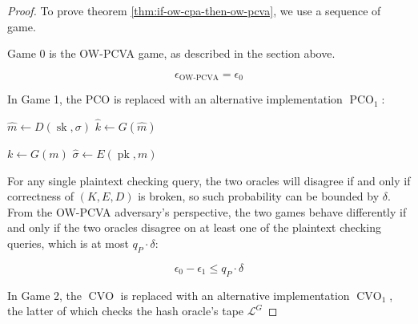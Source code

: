 \documentclass{article}
\newcommand{\pk}{\operatorname{pk}}
\newcommand{\sk}{\operatorname{sk}}
\newcommand{\pco}{\operatorname{PCO}}
\newcommand{\cvo}{\operatorname{CVO}}
\newcommand{\llbrack}{[\![}
\newcommand{\rrbrack}{]\!]}
\begin{document}
\begin{proof}
    To prove theorem \ref{thm:if-ow-cpa-then-ow-pcva}, we use a sequence of game.

    Game 0 is the OW-PCVA game, as described in the section above.

    \begin{equation*}
        \epsilon_\text{OW-PCVA} = \epsilon_0
    \end{equation*}

    In Game 1, the PCO is replaced with an alternative implementation $\pco_1$:

    \begin{multicols}{2}
        \begin{algorithm}[H]
            \caption{$\pco$}
            \SetAlgoLined
            $\hat{m} \leftarrow D(\sk, \sigma)$\;
            $\hat{k} \leftarrow G(\hat{m})$\;
            \Return{
                $\llbrack \hat{m} = m \rrbrack$ 
                and $\llbrack V(\hat{k}, \sigma, t) \rrbrack$
            }
        \end{algorithm}

        \begin{algorithm}[H]
            \caption{$\pco_1$}
            \SetAlgoLined
            $k \leftarrow G(m)$\;
            $\hat{\sigma} \leftarrow E(\pk, m)$\;
            \Return{
                $\llbrack \sigma = \hat{\sigma} \rrbrack$
                and $\llbrack V(k, \sigma, t) \rrbrack$
            }
        \end{algorithm}
    \end{multicols}

    For any single plaintext checking query, the two oracles will disagree if and only if correctness of $(K, E, D)$ is broken, so such probability can be bounded by $\delta$. From the OW-PCVA adversary's perspective, the two games behave differently if and only if the two oracles disagree on at least one of the plaintext checking queries, which is at most $q_P \cdot \delta$:

    \begin{equation*}
        \epsilon_0 - \epsilon_1 \leq q_P \cdot \delta
    \end{equation*}

    In Game 2, the $\cvo$ is replaced with an alternative implementation $\cvo_1$, the latter of which checks the hash oracle's tape $\mathcal{L}^G$


\end{proof}
\end{document}
